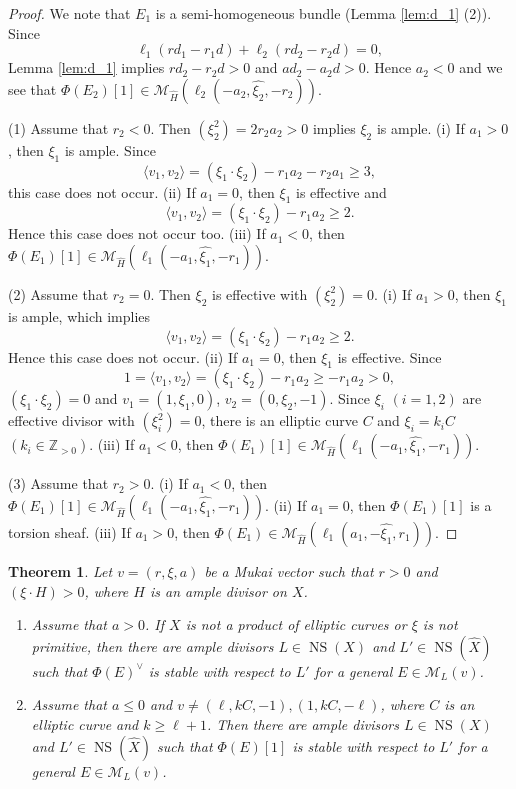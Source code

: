 \documentclass[10pt]{amsart}
\def\cal{\mathcal}
\def\Bbb{\mathbb}
\newcommand{\NS}{\operatorname{NS}}
\numberwithin{equation}{section}
\theoremstyle{plain}
\newtheorem{thm}{Theorem}[section]
\theoremstyle{definition}
\theoremstyle{remark}
\begin{document}
\begin{proof}
We note that $E_1$ is a semi-homogeneous bundle (Lemma \ref{lem:d_1} (2)). 
Since 
$$
\ell_1(rd_1-r_1 d)+\ell_2(rd_2-r_2 d)=0,
$$
Lemma \ref{lem:d_1} implies
$rd_2-r_2 d>0$ and $ad_2-a_2 d>0$.
Hence $a_2<0$ and we see that
$\Phi(E_2)[1] \in {\cal M}_{\widehat{H}}(\ell_2(-a_2,\widehat{\xi_2},-r_2))$.

(1) Assume that $r_2<0$.
Then $(\xi_2^2)=2r_2 a_2>0$ implies $\xi_2$ is ample.
(i) If $a_1>0$, then $\xi_1$ is ample.
Since 
$$
\langle v_1,v_2 \rangle=(\xi_1 \cdot \xi_2)-r_1 a_2-r_2 a_1 \geq 3,
$$
this case does not occur.
(ii) If $a_1=0$, then $\xi_1$ is effective and
$$
\langle v_1,v_2 \rangle=(\xi_1 \cdot \xi_2)-r_1 a_2 \geq 2.
$$
Hence this case does not occur too.
(iii) If $a_1<0$, then $\Phi(E_1)[1] \in {\cal M}_{\widehat{H}}(\ell_1(-a_1,\widehat{\xi_1},-r_1))$.

(2) Assume that $r_2=0$.
Then $\xi_2$ is effective with $(\xi_2^2)=0$.
(i) If $a_1>0$, then $\xi_1$ is ample, which implies
$$
\langle v_1,v_2 \rangle=(\xi_1 \cdot \xi_2)-r_1 a_2 \geq 2.
$$
Hence this case does not occur.
(ii) If $a_1=0$, then $\xi_1$ is effective.
Since 
$$
1=\langle v_1,v_2 \rangle=(\xi_1 \cdot \xi_2)-r_1 a_2 \geq -r_1 a_2>0,
$$
$(\xi_1 \cdot \xi_2)=0$ and
$v_1=(1,\xi_1,0)$, $v_2=(0,\xi_2,-1)$.
Since $\xi_i$ $(i=1,2)$ are effective divisor with $(\xi_i^2)=0$, 
there is an elliptic curve $C$ and
$\xi_i=k_i C$ $(k_i \in {\Bbb Z}_{>0})$.
(iii) If $a_1<0$, then $\Phi(E_1)[1] \in {\cal M}_{\widehat{H}}(\ell_1(-a_1,\widehat{\xi_1},-r_1))$.


(3) Assume that $r_2>0$.
(i) If $a_1<0$, then $\Phi(E_1)[1] \in {\cal M}_{\widehat{H}}(\ell_1(-a_1,\widehat{\xi_1},-r_1))$.
(ii) If $a_1= 0$, then $\Phi(E_1)[1]$ is a torsion sheaf.
(iii) If $a_1>0$, then $\Phi(E_1) \in {\cal M}_{\widehat{H}}(\ell_1(a_1,-\widehat{\xi_1},r_1))$.
\end{proof}


\begin{thm}\label{thm:stability}
Let $v=(r,\xi,a)$ be a Mukai vector such that $r > 0$ and $(\xi \cdot H)>0$, where 
$H$ is an ample divisor on $X$.
\begin{enumerate}
\item[(1)]
Assume that $a>0$. 
If $X$ is not a product of elliptic curves or $\xi$ is not primitive,
then there are ample divisors $L \in \NS(X)$ and $L' \in \NS(\widehat{X})$ such that 
$\Phi(E)^{\vee}$ is stable with respect to $L'$ for a general
$E \in {\cal M}_L(v)$.
\item[(2)]
Assume that $a \leq 0$ and
$v \ne (\ell,kC,-1), (1,kC,-\ell)$, where 
$C$ is an elliptic curve and $k \geq \ell+1$. 
Then there are ample divisors $L \in \NS(X)$ and $L' \in \NS(\widehat{X})$ such that 
$\Phi(E)[1]$ is stable with respect to $L'$ for a general
$E \in {\cal M}_L(v)$.
\end{enumerate}
\end{thm}
\end{document}
